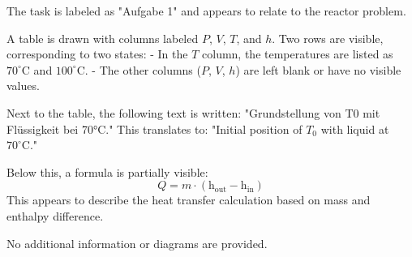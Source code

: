The task is labeled as "Aufgabe 1" and appears to relate to the reactor problem.  

A table is drawn with columns labeled \( P \), \( V \), \( T \), and \( h \). Two rows are visible, corresponding to two states:  
- In the \( T \) column, the temperatures are listed as \( 70^\circ\text{C} \) and \( 100^\circ\text{C} \).  
- The other columns (\( P \), \( V \), \( h \)) are left blank or have no visible values.  

Next to the table, the following text is written:  
"Grundstellung von T0 mit Flüssigkeit bei 70°C."  
This translates to: "Initial position of \( T_0 \) with liquid at \( 70^\circ\text{C} \)."  

Below this, a formula is partially visible:  
\[
Q = m \cdot (\text{h}_{\text{out}} - \text{h}_{\text{in}})
\]  
This appears to describe the heat transfer calculation based on mass and enthalpy difference.  

No additional information or diagrams are provided.